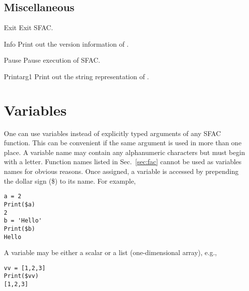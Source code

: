 \subsection{Miscellaneous}

\begin{fundesc}{Exit}{}
Exit SFAC.
\end{fundesc}

\begin{fundesc}{Info}{}
Print out the version information of \cFAC. 
\end{fundesc}

\begin{fundesc}{Pause}{}
Pause execution of SFAC.
\end{fundesc}

\begin{fundesc}{Print}{arg1}
Print out the string representation of .
\end{fundesc}


\section{Variables}
One can use variables instead of explicitly typed arguments of any SFAC
function. This can be convenient if the same argument is used in more than one
place. A variable name may contain any alphanumeric characters but must begin
with a letter. Function names listed in Sec.~\ref{sec:fac} cannot be used as
variables names for obvious reasons. Once assigned, a variable is accessed by
prepending the dollar sign (\$) to its name. For example,
\begin{verbatim}
a = 2
Print($a)
2
b = 'Hello'
Print($b)
Hello
\end{verbatim}
A variable may be either a scalar or a list (one-dimensional array), e.g.,
\begin{verbatim}
vv = [1,2,3]
Print($vv)
[1,2,3]
\end{verbatim}
